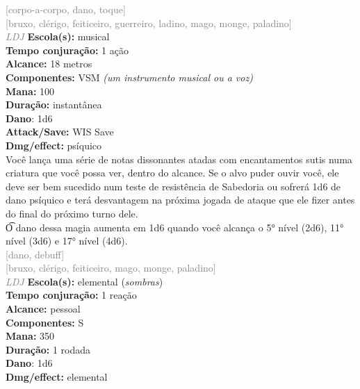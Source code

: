 \documentclass{RPG_Adventure}[2021/10/20]
\begin{document}
{\scriptsize \textcolor{gray}{[corpo-a-corpo, dano, toque]\\}}
{\scriptsize \textcolor{gray}{[bruxo, clérigo, feiticeiro, guerreiro, ladino, mago, monge, paladino]\\}}
{\tiny \textcolor{gray}{\textit{LDJ}}}
{\small \t \textbf{Escola(s):} musical\\\t \textbf{Tempo conjuração:} 1 ação\\\t \textbf{Alcance:} 18 metros\\\t \textbf{Componentes:} VSM \textit{(um instrumento musical ou a voz)}\\\t \textbf{Mana:} 100\\\t \textbf{Duração:} instantânea\\\t \textbf{Dano}: 1d6\\\t \textbf{Attack/Save:} WIS Save\\\t \textbf{Dmg/effect:} psíquico\\}
{\normalsize Você lança uma série de notas dissonantes atadas com encantamentos sutis numa criatura que você possa ver, dentro do alcance. Se o alvo puder ouvir você, ele deve ser bem sucedido num teste de resistência de Sabedoria ou sofrerá 1d6 de dano psíquico e terá desvantagem na próxima jogada de ataque que ele fizer antes do final do próximo turno dele.\\\t O dano dessa magia aumenta em 1d6 quando você alcança o 5° nível (2d6), 11° nível (3d6) e 17° nível (4d6).\\}
{\scriptsize \textcolor{gray}{[dano, debuff]\\}}
{\scriptsize \textcolor{gray}{[bruxo, clérigo, feiticeiro, mago, monge, paladino]\\}}
{\tiny \textcolor{gray}{\textit{LDJ}}}
{\small \t \textbf{Escola(s):} elemental (\textit{sombras})\\\t \textbf{Tempo conjuração:} 1 reação\\\t \textbf{Alcance:} pessoal\\\t \textbf{Componentes:} S\\\t \textbf{Mana:} 350\\\t \textbf{Duração:} 1 rodada\\\t \textbf{Dano}: 1d6\\\t \textbf{Dmg/effect:} elemental\\}
\end{document}
